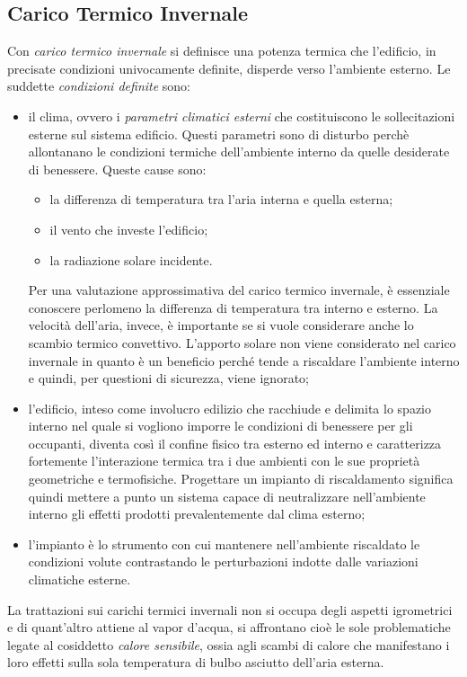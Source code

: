 \subsection{Carico Termico Invernale}
Con \emph{carico termico invernale} si definisce una potenza termica che l'edificio, in precisate condizioni univocamente definite, disperde verso l'ambiente esterno. Le suddette \emph{condizioni definite} sono:
\begin{itemize}
	\item il clima, ovvero i \emph{parametri climatici esterni} che costituiscono le sollecitazioni esterne sul sistema edificio. Questi parametri sono di disturbo perchè allontanano le condizioni termiche dell'ambiente interno da quelle desiderate di benessere. Queste cause sono:
	\begin{itemize}
		\item la differenza di temperatura tra l'aria interna e quella esterna;
		\item il vento che investe l'edificio;
		\item la radiazione solare incidente.
	\end{itemize}
	Per una valutazione approssimativa del carico termico invernale, è essenziale conoscere perlomeno la differenza di temperatura tra interno e esterno. La velocità dell'aria, invece, è importante se si vuole considerare anche lo scambio termico convettivo. L'apporto solare non viene considerato nel carico invernale in quanto è un beneficio perché tende a riscaldare l'ambiente interno e quindi, per questioni di sicurezza, viene ignorato;
	\item l'edificio, inteso come involucro edilizio che racchiude e delimita lo spazio interno nel quale si vogliono imporre le condizioni di benessere per gli occupanti, diventa così il confine fisico tra esterno ed interno e caratterizza fortemente l'interazione termica tra i due ambienti con le sue proprietà geometriche e termofisiche. Progettare un impianto di riscaldamento significa quindi mettere a punto un sistema capace di neutralizzare nell'ambiente interno gli effetti prodotti prevalentemente dal clima esterno;
	\item l'impianto è lo strumento con cui mantenere nell'ambiente riscaldato le condizioni volute contrastando le perturbazioni indotte dalle variazioni climatiche esterne.
\end{itemize}
La trattazioni sui carichi termici invernali non si occupa degli aspetti igrometrici e di quant'altro attiene al vapor d'acqua, si affrontano cioè le sole problematiche legate al cosiddetto \emph{calore sensibile}, ossia agli scambi di calore che manifestano i loro effetti sulla sola temperatura di bulbo asciutto dell'aria esterna.

